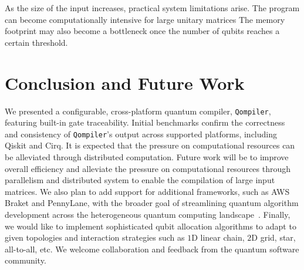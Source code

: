 \documentclass[a4paper,titlepage]{article}
\begin{document}
    As the size of the input increases, practical system limitations arise.
    The program can become computationally intensive for large unitary matrices
    The memory footprint may also become a bottleneck once the number of qubits reaches a certain threshold.


    \section{Conclusion and Future Work}\label{sec:conclusion-and-future-work}
    We presented a configurable, cross-platform quantum compiler, \texttt{Qompiler}, featuring built-in gate traceability.
    Initial benchmarks confirm the correctness and consistency of \texttt{Qompiler}'s
    output across supported platforms, including Qiskit and Cirq.
    It is expected that the pressure on computational resources can be alleviated through distributed computation.
    Future work will be to improve overall efficiency and alleviate the pressure on computational resources through parallelism and distributed system to enable the
    compilation of large input matrices.
    We also plan to add support for additional frameworks, such as AWS Braket and PennyLane,
    with the broader goal of streamlining quantum algorithm development across the heterogeneous quantum
    computing landscape~\cite{braket-zenodo,pennylane}.
    Finally, we would like to implement sophisticated qubit allocation algorithms
    to adapt to given topologies and interaction strategies such as $1$D linear chain,
    $2$D grid, star, all-to-all, etc.
    We welcome collaboration and feedback from the quantum software community.

    
    
\end{document}
